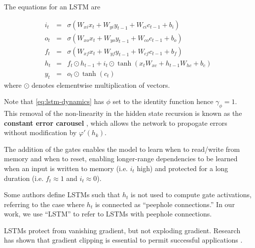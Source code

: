 The equations for an LSTM are

\begin{eqnarray}
    i_t &=& \sigma(W_{xi} x_t + W_{yi} y_{t-1} + W_{ci} c_{t-1} + b_i) \\
    o_t &=& \sigma(W_{xo} x_t + W_{yo} y_{t-1} + W_{co} c_{t-1} + b_o) \\
    f_t &=& \sigma(W_{xf} x_t + W_{yf} y_{t-1} + W_{cf} c_{t-1} + b_f) \\
    h_t &=& f_t \odot h_{t-1} + i_t \odot \tanh(x_t W_{xc} + h_{t-1} W_{hc} + b_c) \label{eq:lstm-dynamics} \\
    y_t &=& o_t \odot \tanh(c_t)
\end{eqnarray}
where $\odot$ denotes elementwise multiplication of vectors.

Note that \autoref{eq:lstm-dynamics} has $\phi$ set to the identity function
hence $\gamma_\phi = 1$. This removal of the non-linearity in the hidden state
recursion is known as the \textbf{constant error carousel} , which
allows the network to propogate errors without modification by $\varphi'(h_k)$.

The addition of the gates enables the model to learn when to read/write from
memory and when to reset, enabling longer-range dependencies to be learned when
an input is written to memory (i.e. $i_t$ high) and protected for a long
duration (i.e. $f_t \approx 1$ and $i_t \approx 0$).

Some authors define LSTMs such that $h_t$ is not used to compute gate activations,
referring to the case where $h_t$ is connected as ``peephole connections.'' In our
work, we use ``LSTM'' to refer to LSTMs with peephole connections.

LSTMs protect from vanishing gradient, but not exploding gradient. Research has shown
that gradient clipping is essential to permit successful applications \cite{Pascanu2012}.
